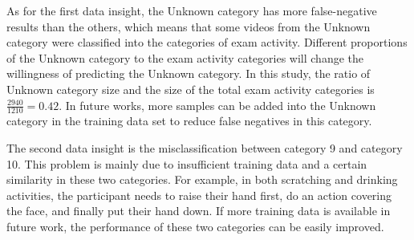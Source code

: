 As for the first data insight, the Unknown category has more false-negative results than the others, which means that some videos from the Unknown category were classified into the categories of exam activity.
Different proportions of the Unknown category to the exam activity categories will change the willingness of predicting the Unknown category.
In this study, the ratio of Unknown category size and the size of the total exam activity categories is $\frac{2940}{1210} = 0.42$.
In future works, more samples can be added into the Unknown category in the training data set to reduce false negatives in this category.

The second data insight is the misclassification between category 9 and category 10.
This problem is mainly due to insufficient training data and a certain similarity in these two categories.
For example, in both scratching and drinking activities, the participant needs to raise their hand first, do an action covering the face, and finally put their hand down.
If more training data is available in future work, the performance of these two categories can be easily improved.
